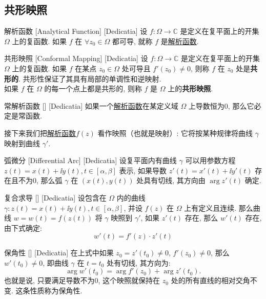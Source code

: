 \documentclass[UTF8]{ctexart}
\newcommand{\AnalyticalFunction}{\hyperref[dfn:AnalyticalFunction]{解析函数}}
\begin{document}
\subsection{共形映照}
\begin{dfn}
    [UUID]
    {解析函数}
    [Analytical Function]
    [Dedicatia]
    设 \( f: \Omega \to \mathbb{C} \) 是定义在复平面上的开集 \( \Omega \) 上的复函数. 如果 \( f \) 在 \(\forall z_0 \in \Omega \) 都可导, 就称 \( f \) 是\AnalyticalFunction. 
\end{dfn}
\begin{dfn}
    [ConformalMapping]
    {共形映照}
    [Conformal Mapping]
    [Dedicatia]
    设 \( f: \Omega \to \mathbb{C} \) 是定义在复平面上的开集 \( \Omega \) 上的复函数. 如果 \( f \) 在某点 \( z_0 \in \Omega \) 处可导且 \( f'(z_0) \neq 0 \), 则称 \( f \) 在 \( z_0 \) 处是\textbf{共形的}. 共形性保证了其具有局部的单调性和逆映射. \\
    如果 \( f \) 在 \( \Omega \) 的每一个点上都是共形的, 则称 \( f \) 是 \( \Omega \) 上的\textbf{共形映照}. 
\end{dfn}
\begin{ppt}
    [TrivialAnalyticalFunction]
    {常解析函数}
    []
    [Dedicatia]
    如果一个\AnalyticalFunction 在某定义域 \( \Omega \) 上导数恒为0, 那么它必定是常函数. 
\end{ppt}
接下来我们把\AnalyticalFunction  \( f(z) \) 看作映照（也就是映射）: 它将按某种规律将曲线 \( \gamma \) 映射到曲线 \( \gamma' \). 
\begin{dfn}
    [UUID]
    {弧微分}
    [Differential Arc]
    [Dedicatia]
    设复平面内有曲线 \( \gamma \) 可以用参数方程 \( z(t)=x(t)+\ii y(t), t\in[\alpha,\beta] \) 表示, 如果导数 \( z'(t)=x'(t)+\ii y'(t) \) 存在且不为0, 那么弧 \( \gamma \) 在 \( (x(t),y(t)) \) 处具有切线, 其方向由 \( \arg z'(t) \) 确定. 
\end{dfn}
\begin{thm}
    [UUID]
    {复合求导}
    []
    [Dedicatia]
    设包含在 \( \Omega \) 内的曲线 \( \gamma:z(t)=x(t)+\ii y(t), t\in[\alpha,\beta] \), 并设 \( f(z) \) 在 \( \Omega \) 上有定义且连续. 那么曲线 \( w=w(t)=f(z(t)) \) 将 \( \gamma \) 映照到 \( \gamma' \), 如果 \( z'(t) \) 存在, 那么 \( w'(t) \) 存在, 由下式确定: 
    \[w'(t)=f'(z)\cdot z'(t)\]
\end{thm}
\begin{thm}
    [UUID]
    {保角性}
    []
    [Dedicatia]
    在上式中如果 \( z_0=z'(t_0)\neq 0 \),  \( f'(z_0)\neq 0 \), 那么 \( w'(t_0)\neq 0 \), 即曲线 \( \gamma \) 在 \( t=t_0 \) 处有切线, 其方向为: 
    \[\arg w'(t_0)=\arg f'(z_0)+\arg z'(t_0).\]
    也就是说, 只要满足导数不为0, 这个映照就保持在 \( z_0 \) 处的所有直线的相对交角不变. 这条性质称为保角性. 
\end{thm}
\end{document}
